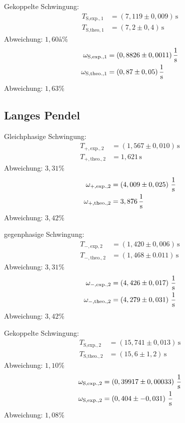Gekoppelte Schwingung:\\
\begin{align*}
    T_{\text{S,exp.},1} &= \left( 7,119 \pm 0,009 \right)\, \unit{\second}\\
    T_{\text{S,theo},1} &= \left( 7,2 \pm 0,4 \right)\, \unit{\second}
\end{align*}
Abweichung: $1,60å\%$
\begin{align*}
    \omega_{\text{S,exp.},1} &= \left( 0,8826 \pm 0,0011 \right)\unit[per-mode=fraction]{\per \second}\\
    \omega_{\text{S,theo.},1} &= \left( 0,87 \pm 0,05 \right)\unit[per-mode=fraction]{\per \second}
\end{align*}
Abweichung: $1,63\%$
%
%
\subsection{Langes Pendel}
Gleichphasige Schwingung:\\
\begin{align*}
    T_{+,\text{exp.},2} &= \left( 1,567 \pm 0,010 \right)\, \unit{\second}\\
    T_{+,\text{theo.},2} &= 1,621\, \unit{\second}
\end{align*}
Abweichung: $3,31\%$
\begin{align*}
    \omega_{+,\text{exp.},2} &= \left( 4,009 \pm 0,025 \right)\, \unit[per-mode=fraction]{\per\second}\\
    \omega_{+,\text{theo.},2} &= 3,876 \, \unit[per-mode=fraction]{\per\second}
\end{align*}
Abweichung: $3,42\%$

gegenphasige Schwingung:\\
\begin{align*}
    T_{-,\text{exp},2} &= \left(1,420 \pm 0,006\right)\,\unit{\second}\\
    T_{-,\text{theo.},2} &= \left( 1,468 \pm 0.011 \right)\,\unit{\second}
\end{align*}
Abweichung: $3,31\%$
\begin{align*}
    \omega_{-,\text{exp.},2} &= \left(4,426 \pm 0,017 \right)\, \unit[per-mode=fraction]{\per\second}\\
    \omega_{-,\text{theo.},2} &= \left( 4,279 \pm 0,031 \right)\, \unit[per-mode=fraction]{\per\second}
\end{align*}
Abweichung: $3,42\%$

Gekoppelte Schwingung:\\
\begin{align*}
    T_{\text{S,exp.},2} &= \left( 15,741 \pm 0,013 \right)\,\unit{\second}\\
    T_{\text{S,theo.},2} &= \left( 15,6 \pm 1,2 \right)\,\unit{\second}
\end{align*}
Abweichung: $1,10\%$
\begin{align*}
    \omega_{\text{S,exp.},2} &= \left( 0,39917 \pm 0,00033  \right)\, \unit[per-mode=fraction]{\per\second}\\
    \omega_{\text{S,exp.},2} &= \left( 0,404 \pm -0,031  \right)\, \unit[per-mode=fraction]{\per\second}
\end{align*}
Abweichung: $1,08\%$
